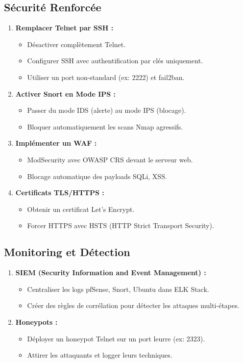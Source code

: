 \documentclass[12pt,a4paper,openany]{report}
\begin{document}
	\subsection{Sécurité Renforcée}
	\begin{enumerate}
		\item \textbf{Remplacer Telnet par SSH :}
		\begin{itemize}
			\item Désactiver complètement Telnet.
			\item Configurer SSH avec authentification par clés uniquement.
			\item Utiliser un port non-standard (ex: 2222) et fail2ban.
		\end{itemize}
		
		\item \textbf{Activer Snort en Mode IPS :}
		\begin{itemize}
			\item Passer du mode IDS (alerte) au mode IPS (blocage).
			\item Bloquer automatiquement les scans Nmap agressifs.
		\end{itemize}
		
		\item \textbf{Implémenter un WAF :}
		\begin{itemize}
			\item ModSecurity avec OWASP CRS devant le serveur web.
			\item Blocage automatique des payloads SQLi, XSS.
		\end{itemize}
		
		\item \textbf{Certificats TLS/HTTPS :}
		\begin{itemize}
			\item Obtenir un certificat Let's Encrypt.
			\item Forcer HTTPS avec HSTS (HTTP Strict Transport Security).
		\end{itemize}
	\end{enumerate}
	
	\subsection{Monitoring et Détection}
	\begin{enumerate}
		\item \textbf{SIEM (Security Information and Event Management) :}
		\begin{itemize}
			\item Centraliser les logs pfSense, Snort, Ubuntu dans ELK Stack.
			\item Créer des règles de corrélation pour détecter les attaques multi-étapes.
		\end{itemize}
		
		\item \textbf{Honeypots :}
		\begin{itemize}
			\item Déployer un honeypot Telnet sur un port leurre (ex: 2323).
			\item Attirer les attaquants et logger leurs techniques.
		\end{itemize}
	\end{enumerate}
	
\end{document}
